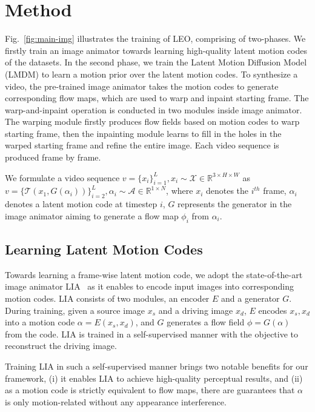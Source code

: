 \section{Method}
Fig.~\ref{fig:main-img} illustrates the training of LEO, comprising of two-phases. We firstly train an image animator towards learning high-quality latent motion codes of the datasets. In the second phase, we train the Latent Motion Diffusion Model (LMDM) to learn a motion prior over the latent motion codes. To synthesize a video, the pre-trained image animator takes the motion codes to generate corresponding flow maps, which are used to warp and inpaint starting frame. The warp-and-inpaint operation is conducted in two modules inside image animator. The warping module firstly produces flow fields based on motion codes to warp starting frame, then the inpainting module learns to fill in the holes in the warped starting frame and refine the entire image. Each video sequence is produced frame by frame.

We formulate a video sequence $v = \{x_i\}^{L}_{i=1}, x_i\sim \mathcal{X}\in\mathbb{R}^{3\times H\times W}$ as $v = \{\mathcal{T}(x_1, G(\alpha_i))\}^{L}_{i=2}, \alpha_i\sim \mathcal{A}\in \mathbb{R}^{1\times N}$, where $x_i$ denotes the $i^{th}$ frame, $\alpha_i$ denotes a latent motion code at timestep $i$, $G$ represents the generator in the image animator aiming to generate a flow map $\phi_{i}$ from $\alpha_{i}$.

\subsection{Learning Latent Motion Codes}
Towards learning a frame-wise latent motion code, we adopt the state-of-the-art image animator LIA~\cite{wang2022latent} as it enables to encode input images into corresponding motion codes.  LIA consists of two modules, an encoder $E$ and a generator $G$. During training, given a source image $x_s$ and a driving image $x_d$, $E$ encodes $x_s, x_d$ into a motion code $\alpha = E(x_s, x_d)$, and $G$ generates a flow field $\phi = G(\alpha)$ from the code. LIA is trained in a self-supervised manner with the objective to reconstruct the driving image. 

Training LIA in such a self-supervised manner brings two notable benefits for our framework, (i) it enables LIA to achieve high-quality perceptual results, and (ii) as a motion code is strictly equivalent to flow maps, there are guarantees that $\alpha$ is only motion-related without any appearance interference. 

